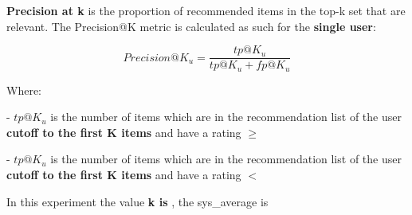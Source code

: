\documentclass[12pt, a4paper]{article}
\begin{document}



\hfill\break
\textbf{Precision at k} is the proportion of recommended items in the top-k set that are relevant.
 The Precision@K metric is calculated as such for the \textbf{single user}:

    \[
    Precision@K_u = \frac{tp@K_u}{tp@K_u + fp@K_u}
    \]

    Where:

    - $tp@K_u$ is the number of items which are in the recommendation list  of the user
      \textbf{cutoff to the first K items} and have a rating $\geq$
        \textbf{}
        \textbf{}


    - $tp@K_u$ is the number of items which are in the recommendation list  of the user
      \textbf{cutoff to the first K items} and have a rating $<$
        \textbf{}
        \textbf{}



In this experiment the value \textbf{k is },
the sys\_average is \textbf{}


\end{document}
